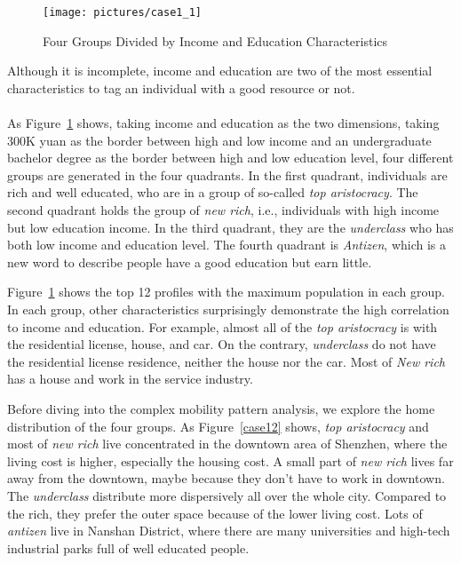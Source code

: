 \begin{figure}[htb!]
 \centering
 \texttt{[image: pictures/case1\_1]}
 \caption{Four Groups Divided by Income and Education Characteristics}
 \label{case11}
\end{figure}

Although it is incomplete, income and education are two of the most essential characteristics to tag an individual with a good resource or not.\\
\\
As Figure~\ref{case11} shows, taking income and education as the two dimensions, taking 300K yuan as the border between high and low income and an undergraduate bachelor degree as the border between high and low education level, four different groups are generated in the four quadrants. In the first quadrant, individuals are rich and well educated, who are in a group of so-called \textit{top aristocracy}. The second quadrant holds the group of \textit{new rich}, i.e., individuals with high income but low education income. In the third quadrant, they are the \textit{underclass} who has both low income and education level. The fourth quadrant is \textit{Antizen}, which is a new word to describe people have a good education but earn little.


Figure~\ref{case11} shows the top 12 profiles with the maximum population in each group. In each group, other characteristics surprisingly demonstrate the high correlation to income and education. For example, almost all of the \textit{top aristocracy} is with the residential license,  house, and car. On the contrary, \textit{underclass} do not have the residential license residence, neither the house nor the car. Most of \textit{New rich} has a house and work in the service industry.

Before diving into the complex mobility pattern analysis, we explore the home distribution of the four groups. As Figure~\ref{case12} shows, \textit{top aristocracy} and most of \textit{new rich} live concentrated in the downtown area of Shenzhen, where the living cost is higher, especially the housing cost. A small part of \textit{new rich} lives far away from the downtown, maybe because they don't have to work in downtown. The \textit{underclass} distribute more dispersively all over the whole city. Compared to the rich, they prefer the outer space because of the lower living cost. Lots of \textit{antizen} live in Nanshan District, where there are many universities and high-tech industrial parks full of well educated people.  

